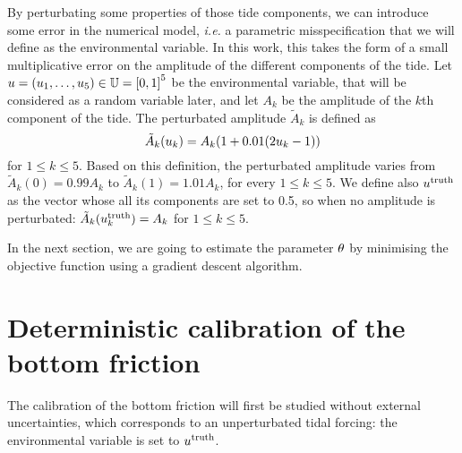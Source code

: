 \documentclass[../../Main_ManuscritThese.tex]{subfiles}
\begin{document}
By perturbating some properties of those tide components, we can
introduce some error in the numerical model, \emph{i.e.} a parametric
misspecification that we will define as the environmental variable. In
this work, this takes the form of a small multiplicative error on the
amplitude of the different components of the tide. Let
$\uu = (\uu_1,\dots,\uu_5)\in \Uspace = \interval{0}{1}^5$ be the
environmental variable, that will be considered as a random variable
later, and let $A_k$ be the amplitude of the $k$th component of the
tide.  The perturbated amplitude $\tilde{A}_k$ is defined as
\begin{equation}
  \label{eq:tide_error}
  \tilde{A}_k(u_k) = A_k (1 + 0.01(2u_k - 1))
\end{equation}
for $1\leq k\leq 5$.
Based on this definition, the perturbated amplitude varies from
$\tilde{A}_k(0) = 0.99A_k$ to $\tilde{A}_k(1) = 1.01A_k$, for every
$1\leq k \leq 5$. We define also $u^{\mathrm{truth}}$ as
the vector whose all its components are set to \num{0.5}, so when no
amplitude is perturbated: $\tilde{A}_k(u_k^{\mathrm{truth}}) = A_k$
for $1\leq k \leq 5$.


In the next section, we are going to estimate the parameter $\theta$ by
minimising the objective function using a gradient descent algorithm.
\section{Deterministic calibration of the bottom friction}
\label{sec:deterministic_calibration_bott}
The calibration of the bottom friction will first be studied without
external uncertainties, which corresponds to an unperturbated tidal
forcing: the environmental variable is set to $u^{\mathrm{truth}}$.
\end{document}
